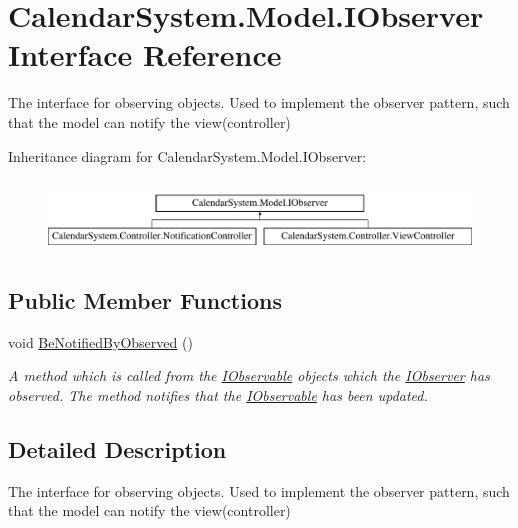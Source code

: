 \hypertarget{interface_calendar_system_1_1_model_1_1_i_observer}{\section{Calendar\+System.\+Model.\+I\+Observer Interface Reference}
\label{interface_calendar_system_1_1_model_1_1_i_observer}
}


The interface for observing objects. Used to implement the observer pattern, such that the model can notify the view(controller)  


Inheritance diagram for Calendar\+System.\+Model.\+I\+Observer\+:\begin{figure}[H]
\begin{center}
\leavevmode
\includegraphics[height=1.898305cm]{interface_calendar_system_1_1_model_1_1_i_observer}
\end{center}
\end{figure}
\subsection*{Public Member Functions}
\begin{DoxyCompactItemize}
\item 
void \hyperlink{interface_calendar_system_1_1_model_1_1_i_observer_a87a0dd14cdbb1ae4b4531329011167fb}{Be\+Notified\+By\+Observed} ()
\begin{DoxyCompactList}\small\item\em A method which is called from the \hyperlink{interface_calendar_system_1_1_model_1_1_i_observable}{I\+Observable} objects which the \hyperlink{interface_calendar_system_1_1_model_1_1_i_observer}{I\+Observer} has observed. The method notifies that the \hyperlink{interface_calendar_system_1_1_model_1_1_i_observable}{I\+Observable} has been updated. \end{DoxyCompactList}\end{DoxyCompactItemize}


\subsection{Detailed Description}
The interface for observing objects. Used to implement the observer pattern, such that the model can notify the view(controller) 



